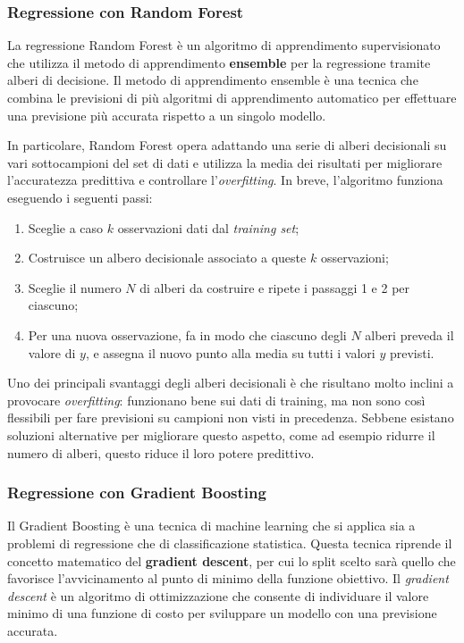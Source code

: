 \subsubsection{Regressione con Random Forest}\label{sssec:regressione-rf}
La regressione Random Forest è un algoritmo di apprendimento supervisionato che utilizza il metodo di apprendimento \textbf{ensemble} per la regressione tramite alberi di decisione. Il metodo di apprendimento ensemble è una tecnica che combina le previsioni di più algoritmi di apprendimento automatico per effettuare una previsione più accurata rispetto a un singolo modello. \cite{random_forest}

In particolare, Random Forest opera adattando una serie di alberi decisionali su vari sottocampioni del set di dati e utilizza la media dei risultati per migliorare l'accuratezza predittiva e controllare l'\textit{overfitting}.
In breve, l'algoritmo funziona eseguendo i seguenti passi:

\begin{enumerate}
  \item Sceglie a caso $k$ osservazioni dati dal \textit{training set};
  \item Costruisce un albero decisionale associato a queste $k$ osservazioni;
  \item Sceglie il numero $N$ di alberi da costruire e ripete i passaggi 1 e 2 per ciascuno;
  \item Per una nuova osservazione, fa in modo che ciascuno degli $N$ alberi preveda il valore di $y$, e assegna il nuovo punto alla media su tutti i valori $y$ previsti.
\end{enumerate}

Uno dei principali svantaggi degli alberi decisionali è che risultano molto inclini a provocare \textit{overfitting}: funzionano bene sui dati di training, ma non sono così flessibili per fare previsioni su campioni non visti in precedenza. Sebbene esistano soluzioni alternative per migliorare questo aspetto, come ad esempio ridurre il numero di alberi, questo riduce il loro potere predittivo.

\subsubsection{Regressione con Gradient Boosting}\label{sssec:regressione-gb}
Il Gradient Boosting è una tecnica di machine learning che si applica sia a problemi di regressione che di classificazione statistica. Questa tecnica riprende il concetto matematico del \textbf{gradient descent}, per cui lo split scelto sarà quello che favorisce l’avvicinamento al punto di minimo della funzione obiettivo. Il \textit{gradient descent} è un algoritmo di ottimizzazione che consente di individuare il valore minimo di una funzione di costo per sviluppare un modello con una previsione accurata.

